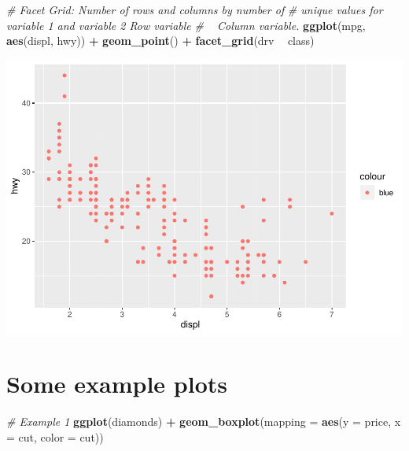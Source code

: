 \documentclass[
]{book}
\newenvironment{Shaded}{\begin{snugshade}}{\end{snugshade}}
\newcommand{\CommentTok}[1]{\textcolor[rgb]{0.56,0.35,0.01}{\textit{#1}}}
\newcommand{\DataTypeTok}[1]{\textcolor[rgb]{0.13,0.29,0.53}{#1}}
\newcommand{\KeywordTok}[1]{\textcolor[rgb]{0.13,0.29,0.53}{\textbf{#1}}}
\newcommand{\NormalTok}[1]{#1}
\newcommand{\OperatorTok}[1]{\textcolor[rgb]{0.81,0.36,0.00}{\textbf{#1}}}
\newcommand{\StringTok}[1]{\textcolor[rgb]{0.31,0.60,0.02}{#1}}
\begin{document}
\begin{Shaded}
\begin{Highlighting}[]
\CommentTok{# Facet Grid: Number of rows and columns by number of}
\CommentTok{# unique values for variable 1 and variable 2 Row variable}
\CommentTok{# ~ Column variable.}
\KeywordTok{ggplot}\NormalTok{(mpg, }\KeywordTok{aes}\NormalTok{(displ, hwy)) }\OperatorTok{+}\StringTok{ }\KeywordTok{geom_point}\NormalTok{() }\OperatorTok{+}\StringTok{ }\KeywordTok{facet_grid}\NormalTok{(drv }\OperatorTok{~}
\StringTok{    }\NormalTok{class)}
\end{Highlighting}
\end{Shaded}

\includegraphics{_main_files/figure-latex/unnamed-chunk-256-2.pdf}

\hypertarget{some-example-plots}{%
\section{Some example plots}\label{some-example-plots}}

\begin{Shaded}
\begin{Highlighting}[]
\CommentTok{# Example 1}
\KeywordTok{ggplot}\NormalTok{(diamonds) }\OperatorTok{+}\StringTok{ }\KeywordTok{geom_boxplot}\NormalTok{(}\DataTypeTok{mapping =} \KeywordTok{aes}\NormalTok{(}\DataTypeTok{y =}\NormalTok{ price, }\DataTypeTok{x =}\NormalTok{ cut,}
    \DataTypeTok{color =}\NormalTok{ cut))}
\end{Highlighting}
\end{Shaded}
\end{document}
